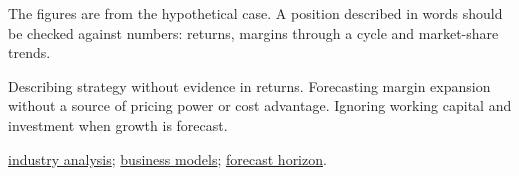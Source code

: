 \begin{qfmethod}
 The figures are from the hypothetical case. A position described in words should be checked against numbers: returns, margins through a cycle and market-share trends.

 Describing strategy without evidence in returns. Forecasting margin expansion without a source of pricing power or cost advantage. Ignoring working capital and investment when growth is forecast.

 \hyperref[meth:industry-analysis]{industry analysis}; \hyperref[def:business-model-features-types]{business models}; \hyperref[meth:forecast-horizon-steady-state]{forecast horizon}.

\end{qfmethod}
